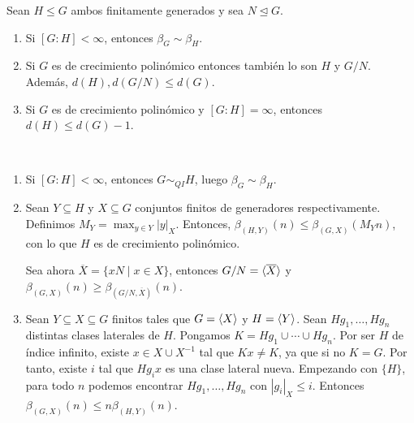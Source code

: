 \documentclass[twoside, 11pt]{article}
\begin{document}
\begin{prop}
Sean $H\leq G$ ambos finitamente generados y sea $N\trianglelefteq G$.
\begin{enumerate}
\item Si $[G:H]<\infty$, entonces $\beta_G\sim\beta_H$.
\item Si $G$ es de crecimiento polinómico entonces también lo son $H$ y $G/N$. Además, $d(H),d(G/N)\leq d(G)$.
\item Si $G$ es de crecimiento polinómico y $[G:H]=\infty$, entonces $d(H)\leq d(G)-1$.
\end{enumerate}
\end{prop}
\begin{dem}\
\begin{enumerate}
\item Si $[G:H]<\infty$, entonces $G\sim_{QI} H$, luego $\beta_G\sim\beta_H$.
\item Sean $Y\subseteq H$ y $X\subseteq G$ conjuntos finitos de generadores respectivamente. Definimos $M_Y=\max_{y\in Y}|y|_X$. Entonces, $\beta_{(H,Y)}(n)\leq \beta_{(G,X)}(M_Y n)$, con lo que $H$ es de crecimiento polinómico.

Sea ahora $\overline{X}=\{xN\mid x\in X\}$, entonces $G/N=\langle{\overline{X}}\rangle$ y $\beta_{(G,X)}(n)\geq \beta_{(G/N,\overline{X})}(n)$. 

\item Sean $Y\subseteq X\subseteq G$ finitos tales que $G=\langle{X}\rangle$ y $H=\langle{Y}\rangle$. Sean $Hg_1,\dots, Hg_n$ distintas clases laterales de $H$. Pongamos $K=Hg_1\cup\cdots\cup Hg_n$. Por ser $H$ de índice infinito, existe $x\in X\cup X^{-1}$ tal que $Kx\neq K$, ya que si no $K=G$. Por tanto, existe $i$ tal que $Hg_ix$ es una clase lateral nueva. Empezando con $\{H\}$, para todo $n$ podemos encontrar $Hg_1,\dots, Hg_n$ con $|g_i|_X\leq i$. Entonces $\beta_{(G,X)}(n)\leq n\beta_{(H,Y)}(n)$.\QED
\end{enumerate}
\end{dem}
\end{document}
